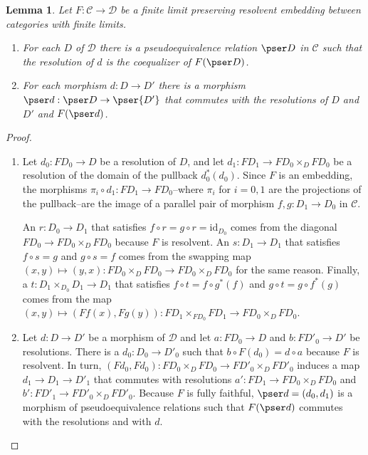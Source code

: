 \documentclass[sort&compress,draft]{elsarticle}
\theoremstyle{plain}
\newtheorem{lemma}[theorem]{Lemma}
\theoremstyle{definition}
\theoremstyle{remark}
\newcommand\cat\mathcal
\newcommand\of:
\newcommand\ri{^*}
\newcommand\id{\mathrm{id}}
\begin{document}
\begin{lemma} Let $F\of\cat C\to\cat D$ be a finite limit preserving resolvent embedding between categories with finite limits.
\begin{enumerate}
\item For each $D$ of $\cat D$ there is a pseudoequivalence relation $\pser D$ in $\cat C$ such that the resolution of $d$ is the coequalizer of $F(\pser D)$. 
\item For each morphism $d\of D\to D'$ there is a morphism $\pser d\of\pser D\to \pser{D'}$ that commutes with the resolutions of $D$ and $D'$ and $F(\pser d)$.
\end{enumerate}\label{induced psers}
\end{lemma}

\begin{proof} 
\begin{enumerate}
\item Let $d_0: FD_0\to D$ be a resolution of $D$, and let $d_1:FD_1 \to FD_0\times_DFD_0$ be a resolution of the domain of the pullback $d_0\ri(d_0)$. Since $F$ is an embedding, the morphisms $\pi_i\circ d_1\of FD_1\to FD_0$--where $\pi_i$ for $i=0,1$ are the projections of the pullback--are the image of a parallel pair of morphism $f,g\of D_1 \to D_0$ in $\cat C$.

An $r:D_0\to D_1$ that satisfies $f\circ r = g\circ r = \id_{D_0}$ comes from the diagonal $FD_0 \to FD_0\times_DFD_0$ because $F$ is resolvent. An $s\of D_1\to D_1$ that satisfies $f\circ s = g$ and $g\circ s = f$ comes from the swapping map $(x,y)\mapsto(y,x)\of FD_0\times_DFD_0\to FD_0\times_DFD_0$ for the same reason. Finally, a $t\of D_1\times_{D_0} D_1\to D_1$ that satisfies $f\circ t = f\circ g\ri(f)$ and $g\circ t = g\circ f\ri(g)$ comes from the map $(x,y) \mapsto (Ff(x),Fg(y)) \of FD_1\times_{FD_0} FD_1\to FD_0\times_DFD_0$.

\item Let $d \of D\to D'$ be a morphism of $\cat D$ and let $a\of FD_0\to D$ and $b\of FD'_0\to D'$ be resolutions. There is a $d_0\of D_0\to D'_0$ such that $b\circ F(d_0) = d\circ a$ because $F$ is resolvent. In turn, $(Fd_0,Fd_0)\of FD_0\times_DFD_0\to FD'_0\times_DFD'_0$ induces a map $d_1\to D_1\to D'_1$ that commutes with resolutions $a'\of FD_1\to FD_0\times_DFD_0$ and $b'\of FD'_1\to FD'_0\times_DFD'_0$. Because $F$ is fully faithful, $\pser d = (d_0,d_1)$ is a morphism of pseudoequivalence relations such that $F(\pser d)$ commutes with the resolutions and with $d$.
\end{enumerate}
\end{proof}
\end{document}
